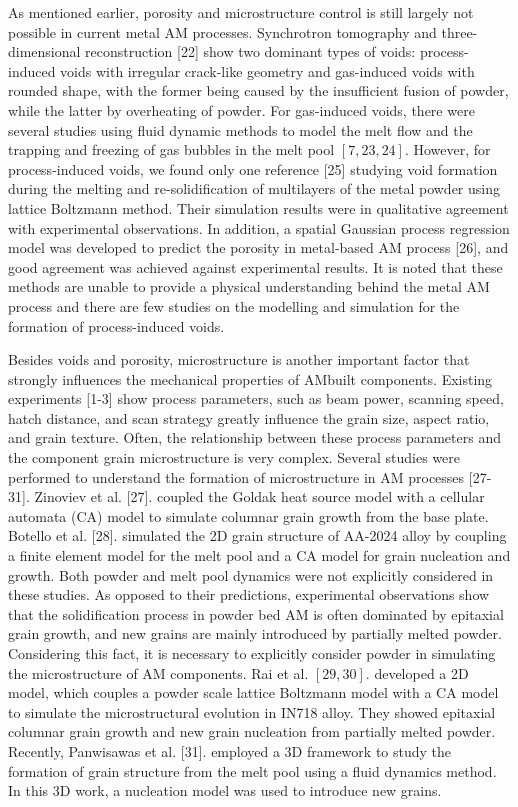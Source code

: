 \documentclass[10pt]{article}
\begin{document}
As mentioned earlier, porosity and microstructure control is still largely not possible in current metal AM processes. Synchrotron tomography and three-dimensional reconstruction [22] show two dominant types of voids: process-induced voids with irregular crack-like geometry and gas-induced voids with rounded shape, with the former being caused by the insufficient fusion of powder, while the latter by overheating of powder. For gas-induced voids, there were several studies using fluid dynamic methods to model the melt flow and the trapping and freezing of gas bubbles in the melt pool $[7,23,24]$. However, for process-induced voids, we found only one reference [25] studying void formation during the melting and re-solidification of multilayers of the metal powder using\\
lattice Boltzmann method. Their simulation results were in qualitative agreement with experimental observations. In addition, a spatial Gaussian process regression model was developed to predict the porosity in metal-based AM process [26], and good agreement was achieved against experimental results. It is noted that these methods are unable to provide a physical understanding behind the metal AM process and there are few studies on the modelling and simulation for the formation of process-induced voids.

Besides voids and porosity, microstructure is another important factor that strongly influences the mechanical properties of AMbuilt components. Existing experiments [1-3] show process parameters, such as beam power, scanning speed, hatch distance, and scan strategy greatly influence the grain size, aspect ratio, and grain texture. Often, the relationship between these process parameters and the component grain microstructure is very complex. Several studies were performed to understand the formation of microstructure in AM processes [27-31]. Zinoviev et al. [27]. coupled the Goldak heat source model with a cellular automata (CA) model to simulate columnar grain growth from the base plate. Botello et al. [28]. simulated the 2D grain structure of AA-2024 alloy by coupling a finite element model for the melt pool and a CA model for grain nucleation and growth. Both powder and melt pool dynamics were not explicitly considered in these studies. As opposed to their predictions, experimental observations show that the solidification process in powder bed AM is often dominated by epitaxial grain growth, and new grains are mainly introduced by partially melted powder. Considering this fact, it is necessary to explicitly consider powder in simulating the microstructure of AM components. Rai et al. $[29,30]$. developed a 2D model, which couples a powder scale lattice Boltzmann model with a CA model to simulate the microstructural evolution in IN718 alloy. They showed epitaxial columnar grain growth and new grain nucleation from partially melted powder. Recently, Panwisawas et al. [31]. employed a 3D framework to study the formation of grain structure from the melt pool using a fluid dynamics method. In this 3D work, a nucleation model was used to introduce new grains.
\end{document}
